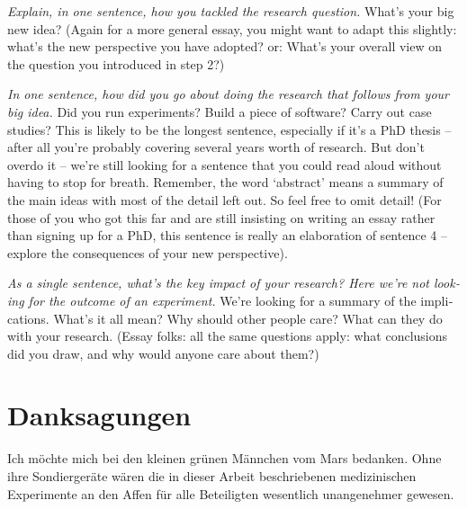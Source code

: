 \documentclass[
  fontsize=10pt,
  numbers=noenddot,
  english,  %
  paper=a5,
  twoside,  %
  DIV=calc,
  headings=small,
  bibliography=totoc,
  listof=totoc,
  draft=false
]{scrbook}
\theoremstyle{break}
\begin{document}
\begin{otherlanguage}{american}
  \emph{Explain, in one sentence, how you tackled the research question.}
  What’s your big new idea?
  (Again for a more general essay, you might want to adapt this slightly: what’s the new perspective you have adopted? or:
  What’s your overall view on the question you introduced in step 2?)

  \emph{In one sentence, how did you go about doing the research that follows from your big idea.}
  Did you run experiments?
  Build a piece of software?
  Carry out case studies?
  This is likely to be the longest sentence, especially if it’s a PhD thesis – after all you’re probably covering several years worth of research.
  But don’t overdo it – we’re still looking for a sentence that you could read aloud without having to stop for breath.
  Remember, the word ‘abstract’ means a summary of the main ideas with most of the detail left out.
  So feel free to omit detail!
  (For those of you who got this far and are still insisting on writing an essay rather than signing up for a PhD, this sentence is really an elaboration of sentence 4 – explore the consequences of your new perspective).

  \emph{As a single sentence, what’s the key impact of your research?
    Here we’re not looking for the outcome of an experiment.
  }
  We’re looking for a summary of the implications.
  What’s it all mean?
  Why should other people care?
  What can they do with your research.
  (Essay folks: all the same questions apply: what conclusions did you draw, and why would anyone care about them?)
\end{otherlanguage}
\pagestyle{scrheadings}
\clearpage

\chapter*{Danksagungen}
Ich möchte mich bei den kleinen grünen Männchen vom Mars bedanken.
Ohne ihre Sondiergeräte wären die in dieser Arbeit beschriebenen medizinischen Experimente an den Affen für alle Beteiligten wesentlich unangenehmer gewesen.
\clearpage



%
%
\tableofcontents
\end{document}
